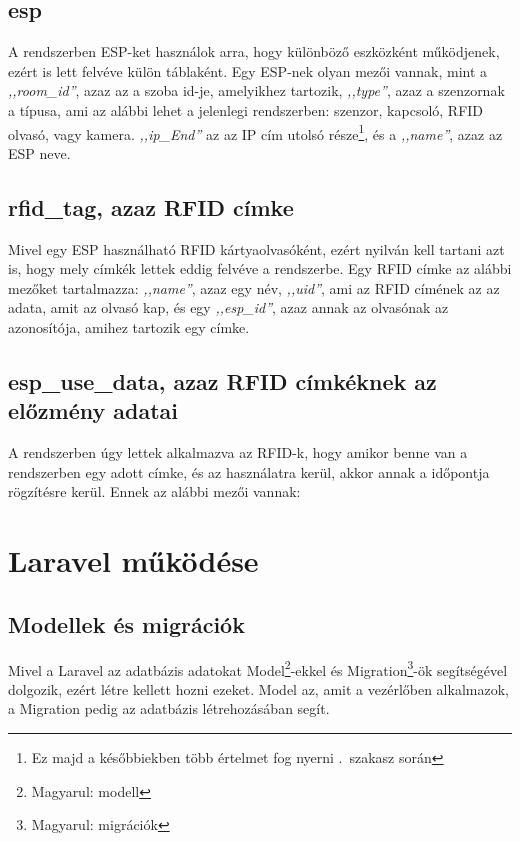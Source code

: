 \documentclass[
]{thesis-ekf}
\theoremstyle{definition}
\theoremstyle{remark}
\begin{document}
	\subsection*{esp}
	A rendszerben ESP-ket használok arra, hogy különböző eszközként működjenek, ezért is lett felvéve külön táblaként. Egy ESP-nek olyan mezői vannak, mint a \emph{,,room\_id''}, azaz az a szoba id-je, amelyikhez tartozik, \emph{,,type''}, azaz a szenzornak a típusa, ami az alábbi lehet a jelenlegi rendszerben: szenzor, kapcsoló, RFID olvasó, vagy kamera.  \emph{,,ip\_End''} az az IP cím utolsó része\footnote{Ez majd a későbbiekben több értelmet fog nyerni .~szakasz során}, és a \emph{,,name''}, azaz az ESP neve.
	
	\subsection*{rfid\_tag, azaz RFID címke}
	Mivel egy ESP használható RFID kártyaolvasóként, ezért nyilván kell tartani azt is, hogy mely címkék lettek eddig felvéve a rendszerbe. Egy RFID címke az alábbi mezőket tartalmazza: \emph{,,name''}, azaz egy név, \emph{,,uid''}, ami az RFID címének az az adata, amit az olvasó kap, és egy \emph{,,esp\_id''}, azaz annak az olvasónak az azonosítója, amihez tartozik egy címke.
	
	\subsection*{esp\_use\_data, azaz RFID címkéknek az előzmény adatai}
	A rendszerben úgy lettek alkalmazva az RFID-k, hogy amikor benne van a rendszerben egy adott címke, és az használatra kerül, akkor annak a időpontja rögzítésre kerül. Ennek az alábbi mezői vannak: 
	
	\section{Laravel működése}
	
	\subsection{Modellek és migrációk}
	Mivel a Laravel az adatbázis adatokat Model\footnote{Magyarul: modell}-ekkel és Migration\footnote{Magyarul: migrációk}-ök segítségével dolgozik, ezért létre kellett hozni ezeket. 
	Model az, amit a vezérlőben alkalmazok, a Migration pedig az adatbázis létrehozásában segít.\cite{laravel-model}
	
\end{document}
